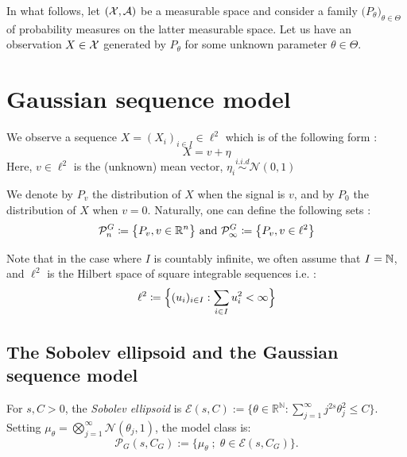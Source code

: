 In what follows, let $(\mathcal{X},\mathcal{A})$ be a measurable space and consider a family $\big(P_\theta\big)_{\theta\in\Theta}$ of probability measures on the latter measurable space. Let us have an observation $X\in \mathcal{X}$ generated by $P_\theta$ for some unknown parameter $\theta \in \Theta$. 
\section{Gaussian sequence model} 
\begin{definition}
    We observe a sequence $X = (X_i)_{i\in I} \in \ell^2$ which is of the following form : 
    \begin{equation}\label{gaussmodel}
        X = v + \eta
    \end{equation}
    Here, $v\in \ell^2$ is the (unknown) mean vector, $\eta_i \stackrel{i.i.d}{\sim} \mathcal{N}(0,1)$ 
\end{definition}
\noindent
We denote by $P_v$ the distribution of $X$ when the signal is $v$, and by $P_0$ the distribution of $X$ when $v = 0$. Naturally, one can define the following sets : 
\begin{equation*}
    \mathcal{P}^{G}_n \coloneqq \bigl\{P_v, v \in \mathbb{R}^n\bigr\} \text{ and } \mathcal{P}^{G}_\infty \coloneqq \bigl\{P_v, v\in \ell^2\bigr\}
\end{equation*}

\begin{remark}
    Note that in the case where $I$ is countably infinite, we often assume that $I = \mathbb{N}$, and $\ell^2$ is the Hilbert space of square integrable sequences i.e. : 
\begin{equation*}
    \ell^2 \coloneqq \Bigl\{ (u_i)_{i\in I} : \sum_{i \in I} u_i^2 < \infty \Bigr\}
\end{equation*}
\end{remark}
\subsection{The Sobolev ellipsoid and the Gaussian sequence model}

\begin{definition}
For $s, C > 0$, the \emph{Sobolev ellipsoid} is $\mathcal{E}(s,C) := \bigl\{\theta \in
\mathbb{R}^{\mathbb{N}} : \sum_{j=1}^\infty j^{2s}\theta_j^2 \leq C\bigr\}$. Setting
$\mu_\theta = \bigotimes_{j=1}^\infty \mathcal{N}(\theta_j, 1)$, the model class is:
\[
    \mathcal{P}_G(s, C_G) := \{\mu_\theta \;;\; \theta \in \mathcal{E}(s, C_G)\}.
\]
\end{definition}

